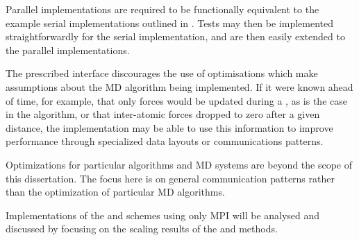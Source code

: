 Parallel implementations are required to be functionally equivalent
to the example serial implementations outlined in .
%
Tests may then be implemented straightforwardly for the serial implementation,
and are then easily extended to the parallel implementations.

The prescribed interface discourages the use of optimisations which make
assumptions about the MD algorithm being implemented.
%
If it were known ahead of time, for example, that
only forces would be updated during a \pairoperation{},
as is the case in the \velocityverlet{} algorithm,
or that inter-atomic forces dropped to zero after a given distance,
the implementation may be able to use this information to improve
performance through specialized data layouts or communications patterns.

Optimizations for particular algorithms and MD systems are
beyond the scope of this dissertation.
%
The focus here is on general communication patterns rather than
the optimization of particular MD algorithms.

Implementations of the \replicateddata{} and \systolicloop{} schemes
using only MPI will be analysed and discussed by focusing on
the scaling results of the \individualoperation{} and \pairoperation{} methods.






